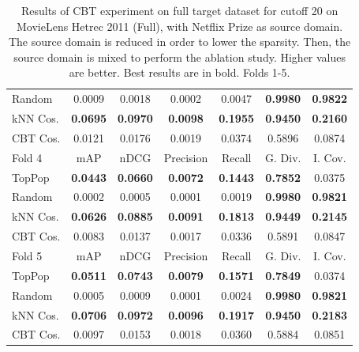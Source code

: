 \begin{table}[hbt]
\begin{tabulary}{\textwidth}{|L|CCCCCC|}
Random & 0.0009 &           0.0018 &           0.0002 &           0.0047 &                                  \textbf{0.9980} &                                   \textbf{0.9822} \\
kNN Cos. & \textbf{0.0695} &  \textbf{0.0970} &  \textbf{0.0098} &  \textbf{0.1955} &                                  \textbf{0.9450} &                                   \textbf{0.2160} \\
CBT Cos. & 0.0121 &           0.0176 &           0.0019 &           0.0374 &                                           0.5896 &                                            0.0874 \\
\hline
\hline
Fold 4 & mAP & nDCG & Precision & Recall & G. Div. & I. Cov. \\
\hline
TopPop & \textbf{0.0443} &  \textbf{0.0660} &  \textbf{0.0072} &  \textbf{0.1443} &                                  \textbf{0.7852} &                                            0.0375 \\
Random & 0.0002 &           0.0005 &           0.0001 &           0.0019 &                                  \textbf{0.9980} &                                   \textbf{0.9821} \\
kNN Cos. & \textbf{0.0626} &  \textbf{0.0885} &  \textbf{0.0091} &  \textbf{0.1813} &                                  \textbf{0.9449} &                                   \textbf{0.2145} \\
CBT Cos. & 0.0083 &           0.0137 &           0.0017 &           0.0336 &                                           0.5891 &                                            0.0847 \\
\hline
\hline
Fold 5 & mAP & nDCG & Precision & Recall & G. Div. & I. Cov. \\
\hline
TopPop & \textbf{0.0511} &  \textbf{0.0743} &  \textbf{0.0079} &  \textbf{0.1571} &                                  \textbf{0.7849} &                                            0.0374 \\
Random & 0.0005 &           0.0009 &           0.0001 &           0.0024 &                                  \textbf{0.9980} &                                   \textbf{0.9821} \\
kNN Cos. & \textbf{0.0706} &  \textbf{0.0972} &  \textbf{0.0096} &  \textbf{0.1917} &                                  \textbf{0.9450} &                                   \textbf{0.2183} \\
CBT Cos. & 0.0097 &           0.0153 &           0.0018 &           0.0360 &                                           0.5884 &                                            0.0851 \\
\hline
\end{tabulary}
\caption{Results of CBT experiment on full target dataset for cutoff 20 on MovieLens Hetrec 2011 (Full), with Netflix Prize as source domain. The source domain is reduced in order to lower the sparsity. Then, the source domain is mixed to perform the ablation study. Higher values are better. Best results are in bold. Folds 1-5.}
\end{table}

